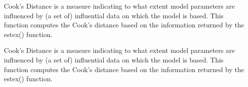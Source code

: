 Cook’s Distance is a measure indicating to what extent model parameters are influenced by (a set
of) influential data on which the model is based. This function computes the Cook’s distance based
on the information returned by the estex() function.



Cook’s Distance is a measure indicating to what extent model parameters are influenced by (a set
of) influential data on which the model is based. This function computes the Cook’s distance based
on the information returned by the estex() function.
